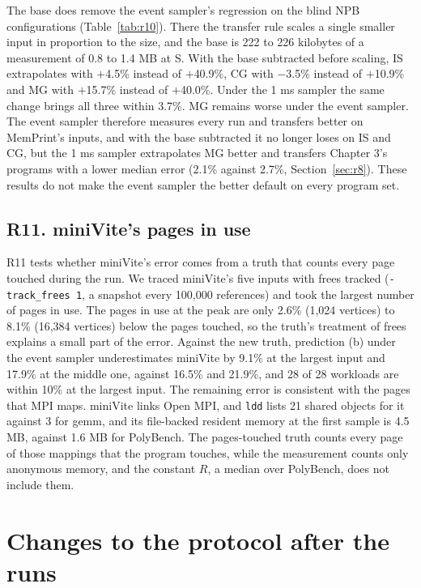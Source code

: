 \documentclass[11pt]{article}
\newcommand{\memprint}{MemPrint}
\begin{document}
The base does remove the event sampler's regression on the blind NPB configurations (Table~\ref{tab:r10}). There
the transfer rule scales a single smaller input in proportion to the size, and the base is 222 to 226 kilobytes of
a measurement of 0.8 to 1.4 MB at S. With the base subtracted before scaling, IS extrapolates with $+$4.5\% instead
of $+$40.9\%, CG with $-$3.5\% instead of $+$10.9\% and MG with $+$15.7\% instead of $+$40.0\%. Under the 1 ms
sampler the same change brings all three within 3.7\%. MG remains worse under the event sampler. The event
sampler therefore measures every run and transfers better on \memprint{}'s inputs, and with the base subtracted it
no longer loses on IS and CG, but the 1 ms sampler extrapolates MG better and transfers Chapter 3's programs with a
lower median error (2.1\% against 2.7\%, Section~\ref{sec:r8}). These results do not make the event sampler the
better default on every program set.

\subsection{R11. miniVite's pages in use}
\label{sec:r11}

R11 tests whether miniVite's error comes from a truth that counts every page touched during the run. We traced
miniVite's five inputs with frees tracked (\texttt{-track\_frees 1}, a snapshot every 100,000 references) and took
the largest number of pages in use. The pages in use at the peak are only 2.6\% (1,024 vertices) to 8.1\% (16,384
vertices) below the pages touched, so the truth's treatment of frees explains a small part of the error. Against
the new truth, prediction (b) under the event sampler underestimates miniVite by 9.1\% at the largest input and
17.9\% at the middle one, against 16.5\% and 21.9\%, and 28 of 28 workloads are within 10\% at the largest
input. The remaining error is consistent with the pages that MPI maps. miniVite links Open MPI, and \texttt{ldd} lists 21
shared objects for it against 3 for gemm, and its file-backed resident memory at the first sample is 4.5 MB, against 1.6 MB for PolyBench. The
pages-touched truth counts every page of those mappings that the program touches, while the measurement counts
only anonymous memory, and the constant $R$, a median over PolyBench, does not include them.

\section{Changes to the protocol after the runs}
\label{sec:amend}
\end{document}
